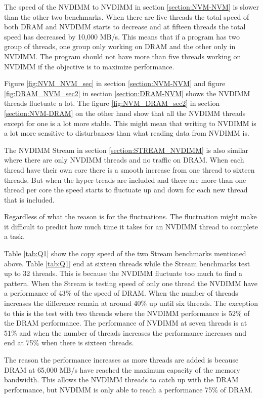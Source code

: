 \documentclass[12pt,a4paper,USenglish]{article}      %
\begin{document}
The speed of the NVDIMM to NVDIMM in section \ref{section:NVM-NVM} is slower than the other two benchmarks. When there are five threads the total speed of both DRAM and NVDIMM starts to decrease and at fifteen threads the total speed has decreased by 10,000 MB/s. 
This means that if a program has two group of threads, one group only working on DRAM and the other only in NVDIMM. The program should not have more than five threads working on NVDIMM if the objective is to maximize performance.

Figure \ref{fig:NVM_NVM_sec} in section \ref{section:NVM-NVM} and figure \ref{fig:DRAM_NVM_sec2} in section \ref{section:DRAM-NVM} shows the NVDIMM threads fluctuate a lot. The figure \ref{fig:NVM_DRAM_sec2} in section \ref{section:NVM-DRAM} on the other hand show that all the NVDIMM threads except for one is a lot more stable. This might mean that writing to NVDIMM is a lot more sensitive to disturbances than what reading data from NVDIMM is.

The NVDIMM Stream in section \ref{section:STREAM_NVDIMM} is also similar where there are only NVDIMM threads and no traffic on DRAM. When each thread have their own core there is a smooth increase from one thread to sixteen threads. But when the hyper-treads are included and there are more than one thread per core the speed starts to fluctuate up and down for each new thread that is included.

Regardless of what the reason is for the fluctuations. The fluctuation might make it difficult to predict how much time it takes for an NVDIMM thread to complete a task.

Table \ref{tab:Q1} show the copy speed of the two Stream benchmarks mentioned above. Table \ref{tab:Q1} end at sixteen threads while the Stream benchmarks test up to 32 threads. This is because the NVDIMM fluctuate too much to find a pattern. When the Stream is testing speed of only one thread the NVDIMM have a performance of 43\% of the speed of DRAM. When the number of threads increases the difference remain at around 40\% up until six threads. The exception to this is the test with two threads where the NVDIMM performance is 52\% of the DRAM performance.
The performance of NVDIMM at seven threads is at 51\% and when the number of threads increases the performance increases and end at 75\% when there is sixteen threads.

The reason the performance increases as more threads are added is because DRAM at 65,000 MB/s have reached the maximum capacity of the memory bandwidth. This allows the NVDIMM threads to catch up with the DRAM performance, but NVDIMM is only able to reach a performance 75\% of DRAM.
\end{document}
